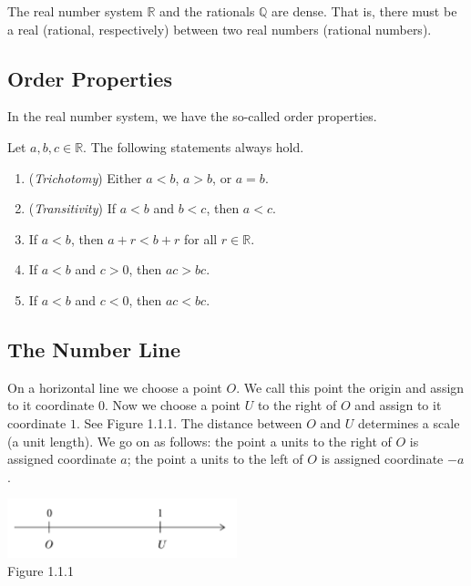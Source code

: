 \documentclass[11pt]{book}
\theoremstyle{break}
\theoremstyle{no_label}
\newcommand{\bbR}{\mathbb{R}}
\newcommand{\figtag}[1]{\\[-1.2em]Figure {#1}}
\numberwithin{equation}{section}
\begin{document}
\begin{proposition}
    The real number system $\bbR$ and the rationals $\mathbb{Q}$ are dense. That is, there must be a real (rational, respectively) between two real numbers (rational numbers).
\end{proposition}

\subsection*{Order Properties}

In the real number system, we have the so-called order properties. 

\begin{theorem}
    Let $a, b, c\in\bbR$. The following statements always hold.
    \begin{enumerate}
        \item (\textit{Trichotomy}) Either $a<b$, $a>b$, or $a=b$.
        \item (\textit{Transitivity}) If $a<b$ and $b<c$, then $a<c$.
        \item If $a<b$, then $a+r<b+r$ for all $r\in\bbR$.
        \item If $a<b$ and $c>0$, then $ac>bc$.
        \item If $a<b$ and $c<0$, then $ac<bc$.
    \end{enumerate}
\end{theorem}

\subsection*{The Number Line}

On a horizontal line we choose a point $O$. We call this point the origin and assign to it coordinate $0$. Now we choose a point $U$ to the right of $O$ and assign to it coordinate $1$. See Figure 1.1.1. The distance between $O$ and $U$ determines a scale (a unit length). We go on as follows: the point a units to the right of $O$ is assigned coordinate $a$; the point a units to the left of $O$ is assigned coordinate $-a$.

\begin{center}
    \includegraphics[width=0.5\textwidth]{number_line.PNG}\figtag{1.1.1}
\end{center}
\end{document}
